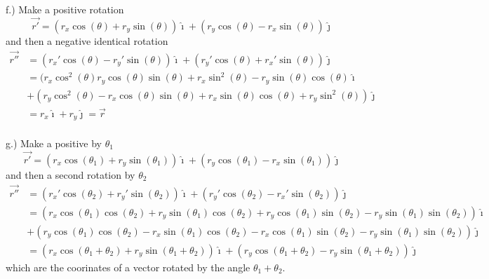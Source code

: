\documentclass[11pt]{amsart}
\begin{document}
f.) Make a positive rotation \[ \vec{r'} = (r_x \cos(\theta) + r_y \sin(\theta))\hat{\imath} + (r_y \cos(\theta) - r_x \sin(\theta)) \hat{\jmath}\]
and then a negative identical rotation 
\begin{align*}
\vec{r''} & = (r_x' \cos(\theta) - r_y' \sin(\theta))\hat{\imath} + (r_y' \cos(\theta) + r_x' \sin(\theta)) \hat{\jmath} \\ 
& = (r_x \cos^2(\theta) r_y \cos(\theta) \sin(\theta) + r_x \sin^2(\theta) - r_y \sin(\theta) \cos(\theta) \hat{\imath} \\ & + (r_y \cos^2(\theta) - r_x \cos(\theta) \sin(\theta) + r_x \sin(\theta) \cos(\theta) + r_y \sin^2(\theta))\hat{\jmath} \\
& = r_x \hat{\imath} + r_y \hat{\jmath} = \vec{r}
\end{align*}\\
g.) Make a positive by $\theta_1$ \[ \vec{r'} = (r_x \cos(\theta_1) + r_y \sin(\theta_1))\hat{\imath} + (r_y \cos(\theta_1) - r_x \sin(\theta_1)) \hat{\jmath}\]
and then a second rotation by $\theta_2$ 
\begin{align*}
\vec{r''} & = (r_x' \cos(\theta_2) + r_y' \sin(\theta_2))\hat{\imath} + (r_y' \cos(\theta_2) - r_x' \sin(\theta_2)) \hat{\jmath} \\ 
& = (r_x \cos(\theta_1) \cos(\theta_2) + r_y \sin(\theta_1) \cos(\theta_2) + r_y \cos(\theta_1) \sin(\theta_2) - r_y \sin(\theta_1) \sin(\theta_2)) \hat{\imath} \\ & + (r_y \cos(\theta_1) \cos(\theta_2) - r_x \sin(\theta_1) \cos(\theta_2) - r_x \cos(\theta_1) \sin(\theta_2) - r_y \sin(\theta_1) \sin(\theta_2))\hat{\jmath} \\
& = (r_x \cos(\theta_1 + \theta_2) + r_y \sin(\theta_1 + \theta_2)) \hat{\imath} +   
(r_y \cos(\theta_1 + \theta_2) - r_y \sin(\theta_1 + \theta_2)) \hat{\jmath}
\end{align*}
which are the coorinates of a vector rotated by the angle $\theta_1 + \theta_2$. \\ \\ 
  
\end{document}
